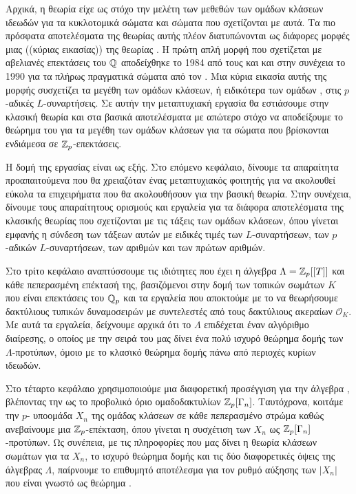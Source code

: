 \hspace{\parindent}Αρχικά, η θεωρία  είχε ως στόχο την 
μελέτη των μεθεθών των ομάδων κλάσεων ιδεωδών για τα κυκλοτομικά σώματα και σώματα που σχετίζονται 
με αυτά. Τα πιο πρόσφατα αποτελέσματα της θεωρίας αυτής πλέον διατυπώνονται ως διάφορες μορφές μιας ((κύριας εικασίας)) της θεωρίας 
. Η πρώτη απλή μορφή που σχετίζεται με αβελιανές επεκτάσεις του $\mathbb{Q}$ αποδείχθηκε το 1984 από τους  και  
και στην συνέχεια το 1990 για τα πλήρως πραγματικά σώματα από τον . Μια κύρια εικασία αυτής της μορφής συσχετίζει τα 
μεγέθη των ομάδων κλάσεων, ή ειδικότερα των ομάδων , στις $p$-αδικές $L$-συναρτήσεις. Σε αυτήν την μεταπτυχιακή εργασία 
θα εστιάσουμε στην κλασική θεωρία και στα βασικά αποτελέσματα με απώτερο στόχο να αποδείξουμε το θεώρημα του  
για τα μεγέθη των ομάδων κλάσεων για τα σώματα που βρίσκονται ενδιάμεσα σε $\mathbb{Z}_p$-επεκτάσεις.

Η δομή της εργασίας είναι ως εξής. Στο επόμενο κεφάλαιο, δίνουμε τα απαραίτητα προαπαιτούμενα που θα χρειαζόταν ένας μεταπτυχιακός φοιτητής για 
να ακολουθεί εύκολα τα επιχειρήματα που θα ακολουθήσουν για την βασική θεωρία. Στην συνέχεια, δίνουμε τους απαραίτητους ορισμούς και εργαλεία 
για τα διάφορα αποτελέσματα της κλασικής θεωρίας  που σχετίζονται με τις τάξεις των ομάδων κλάσεων, όπου γίνεται εμφανής η σύνδεση 
των τάξεων αυτών με ειδικές τιμές των $L$-συναρτήσεων, των $p$-αδικών $L$-συναρτήσεων, των αριθμών  και των  πρώτων αριθμών. 

Στο τρίτο κεφάλαιο αναπτύσσουμε τις ιδιότητες που έχει η άλγεβρα  $\Lambda = \mathbb{Z}_p[[T]]$ και κάθε πεπερασμένη επέκτασή της, βασιζόμενοι στην 
δομή των τοπικών σωμάτων $K$ που είναι επεκτάσεις του $\mathbb{Q}_p$ και τα εργαλεία που αποκτούμε με το να θεωρήσουμε δακτύλιους τυπικών δυναμοσειρών με συντελεστές από 
τους δακτύλιους ακεραίων $\mathcal{O}_K$. Με αυτά τα εργαλεία, δείχνουμε αρχικά ότι το $\Lambda$ επιδέχεται έναν αλγόριθμο διαίρεσης, ο οποίος με την σειρά του 
μας δίνει ένα πολύ ισχυρό θεώρημα δομής των $\Lambda$-προτύπων, όμοιο με το κλασικό θεώρημα δομής πάνω από περιοχές κυρίων ιδεωδών.

Στο τέταρτο κεφάλαιο χρησιμοποιούμε μια διαφορετική προσέγγιση για την άλγεβρα , βλέποντας την ως το προβολικό όριο 
ομαδοδακτυλίων $\mathbb{Z}_p[\Gamma_n]$. Ταυτόχρονα, κοιτάμε την $p$- υποομάδα $X_n$ της ομάδας κλάσεων σε κάθε πεπερασμένο στρώμα 
καθώς ανεβαίνουμε μια $\mathbb{Z}_p$-επέκταση, όπου γίνεται η συσχέτιση των $X_n$ ως $\mathbb{Z}_p[\Gamma_n]$-προτύπων. Ως συνέπεια, με τις πληροφορίες που μας δίνει η θεωρία κλάσεων σωμάτων 
για τα $X_n$, το ισχυρό θεώρημα δομής και τις δύο διαφορετικές όψεις της άλγεβρας $\Lambda$, παίρνουμε το επιθυμητό αποτέλεσμα για τον ρυθμό αύξησης των $|X_n|$ που είναι γνωστό ως θεώρημα .

